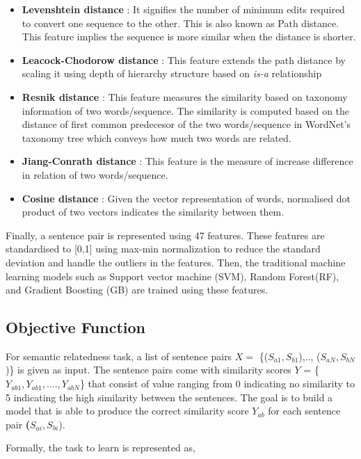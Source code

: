 \documentclass[12pt]{report} %
\begin{document}
	\begin{itemize}
		\item \textbf{Levenshtein distance} : It signifies the number of minimum edits required to convert one sequence to the other. This is also known as Path distance. This feature  implies the sequence is more similar when the distance is shorter. 
		\item\textbf{Leacock-Chodorow distance} : This feature extends the path distance by scaling it using depth of hierarchy structure based on \textit{is-a } relationship
		\item \textbf{Resnik distance} : This feature measures the similarity based on taxonomy information of two words/sequence. The similarity is computed based on the distance of first common predecesor of the two words/sequence in WordNet's taxonomy tree which conveys how much two words are related.
		
		\item \textbf{Jiang-Conrath distance} : This feature is the measure of increase difference in relation of two words/sequence.  
		\item \textbf{Cosine distance} : Given the vector representation of words, normalised dot product of two vectors indicates the similarity between them.
	\end{itemize}
	
	Finally, a sentence pair is represented using 47 features. These features are standardised to [0,1] using max-min normalization to reduce the standard deviation and handle the outliers in the features. Then, the traditional machine learning models such as Support vector machine (SVM), Random Forest(RF), and Gradient Boosting (GB) are trained using these features.
	
	\subsection{Objective Function}  
	
	For semantic relatedness task, a list of sentence pairs $X =$ \{($S_{a1},S_{b1}$),.., ($S_{aN},S_{bN}$)\} is given as input. The sentence pairs come with similarity scores $Y$ = \{$Y_{ab1}, Y_{ab1},...., Y_{abN}$\} that consist of value ranging from 0 indicating no similarity to 5 indicating the high similarity between the sentences. The goal is to build a model that is able to produce the correct similarity score $Y_{ab}$ for each sentence pair \textbf($S_{ai},S_{bi}$).
	
	Formally, the task to learn is represented as,
	
\end{document}
